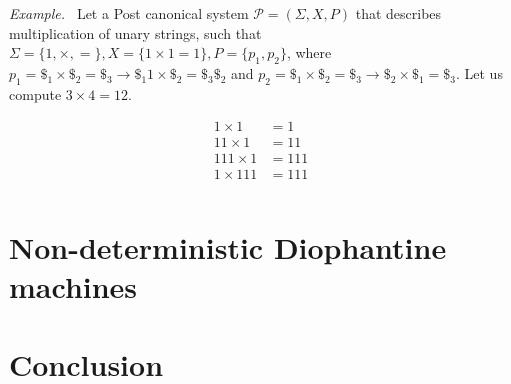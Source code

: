 \documentclass[12pt]{article}
\begin{document}
\emph{Example.~\cite[Problem 12-4.3]{}} Let a Post canonical system $\mathcal{P} = (\Sigma, X, P)$ that describes multiplication of unary strings, such that $\Sigma = \{1, \times, =\}, X = \{1 \times 1 = 1\}, P = \{p_{1}, p_{2}\}$, where $p_{1} = \$_{1} \times \$_{2} = \$_{3} \rightarrow \$_{1}1 \times \$_{2} = \$_{3}\$_{2}$ and $p_{2} = \$_{1} \times \$_{2} = \$_{3} \rightarrow \$_{2} \times \$_{1} = \$_{3}$. Let us compute $3 \times 4 = 12$.

\begin{align*}
    1 \times 1 &= 1 \\
    11 \times 1 &= 11 \\
    111 \times 1 &= 111 \\
    1 \times 111 &= 111 \\
\end{align*}
    

\section{Non-deterministic Diophantine machines}\label{sec:nddm}

\section{Conclusion}\label{sec:conc}



\end{document}
